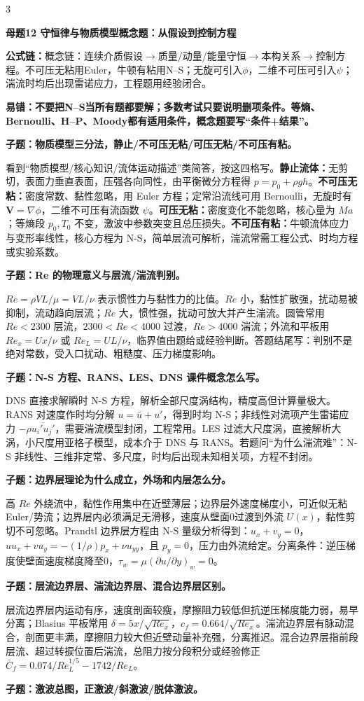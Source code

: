 \documentclass[a4paper]{article}
\newcommand{\mt}[1]{\vspace{0.12pt}\colorbox{M}{\parbox{\dimexpr\linewidth-2\fboxsep}{\color{white}\bfseries #1}}\par}
\newcommand{\qt}[1]{\vspace{0.04pt}\colorbox{Q}{\parbox{\dimexpr\linewidth-2\fboxsep}{\color{white}\bfseries #1}}\par}
\newcommand{\ans}[1]{\colorbox{G}{\parbox{\dimexpr\linewidth-2\fboxsep}{#1}}\par}
\newcommand{\warn}[1]{\colorbox{Y}{\parbox{\dimexpr\linewidth-2\fboxsep}{\color{E}\bfseries #1}}\par}
\newcommand{\form}[1]{{\color{M}\bfseries 公式链：}#1\par}
\begin{document}
\begin{multicols}{3}
\mt{母题12 守恒律与物质模型概念题：从假设到控制方程}
\form{概念链：连续介质假设$\to$质量/动量/能量守恒$\to$本构关系$\to$控制方程。不可压无粘用Euler，牛顿有粘用N--S；无旋可引入$\phi$，二维不可压可引入$\psi$；湍流时均后出现雷诺应力，工程题用经验闭合。}
\warn{易错：不要把N--S当所有题都要解；多数考试只要说明删项条件。等熵、Bernoulli、H--P、Moody都有适用条件，概念题要写“条件+结果”。}
\qt{子题：物质模型三分法，静止/不可压无粘/可压无粘/不可压有粘。}
\ans{看到“物质模型/核心知识/流体运动描述”类简答，按这四格写。\textbf{静止流体：}无剪切，表面力垂直表面，压强各向同性，由平衡微分方程得 $p=p_0+\rho gh$。\textbf{不可压无粘：}密度常数、黏性忽略，用 Euler 方程；定常沿流线可用 Bernoulli，无旋时有 $\bm V=\nabla\phi$，二维不可压有流函数 $\psi$。\textbf{可压无粘：}密度变化不能忽略，核心量为 $Ma$；等熵段 $p_0,T_0$ 不变，激波中参数突变且总压损失。\textbf{不可压有粘：}牛顿流体应力与变形率线性，核心方程为 N-S，简单层流可解析，湍流常需工程公式、时均方程或实验系数。}
\qt{子题：Re 的物理意义与层流/湍流判别。}
\ans{$Re=\rho VL/\mu=VL/\nu$ 表示惯性力与黏性力的比值。$Re$ 小，黏性扩散强，扰动易被抑制，流动趋向层流；$Re$ 大，惯性强，扰动可放大并产生湍流。圆管常用 $Re<2300$ 层流，$2300<Re<4000$ 过渡，$Re>4000$ 湍流；外流和平板用 $Re_x=Ux/\nu$ 或 $Re_L=UL/\nu$，临界值由题给或经验判断。答题结尾写：判别不是绝对常数，受入口扰动、粗糙度、压力梯度影响。}
\qt{子题：N-S 方程、RANS、LES、DNS 课件概念怎么写。}
\ans{DNS 直接求解瞬时 N-S 方程，解析全部尺度涡结构，精度高但计算量极大。RANS 对速度作时均分解 $u=\bar u+u'$，得到时均 N-S；非线性对流项产生雷诺应力 $-\rho\overline{u_i'u_j'}$，需要湍流模型封闭，工程常用。LES 过滤大尺度涡，直接解析大涡，小尺度用亚格子模型，成本介于 DNS 与 RANS。若题问“为什么湍流难”：N-S 非线性、三维非定常、多尺度，时均后出现未知相关项，方程不封闭。}
\qt{子题：边界层理论为什么成立，外场和内层怎么分。}
\ans{高 $Re$ 外绕流中，黏性作用集中在近壁薄层；边界层外速度梯度小，可近似无粘 Euler/势流；边界层内必须满足无滑移，速度从壁面0过渡到外流 $U(x)$，黏性剪切不可忽略。Prandtl 边界层方程由 N-S 量级分析得到：$u_x+v_y=0$，$uu_x+vu_y=-(1/\rho)p_x+\nu u_{yy}$，且 $p_y=0$，压力由外流给定。分离条件：逆压梯度使壁面速度梯度降至0，$\tau_w=\mu(\partial u/\partial y)_w=0$。}
\qt{子题：层流边界层、湍流边界层、混合边界层区别。}
\ans{层流边界层内运动有序，速度剖面较瘦，摩擦阻力较低但抗逆压梯度能力弱，易早分离；Blasius 平板常用 $\delta=5x/\sqrt{Re_x}$，$c_f=0.664/\sqrt{Re_x}$。湍流边界层有脉动混合，剖面更丰满，摩擦阻力较大但近壁动量补充强，分离推迟。混合边界层指前段层流、超过转捩位置后湍流，总阻力按分段积分或经验修正 $\bar C_f=0.074/Re_L^{1/5}-1742/Re_L$。}
\qt{子题：激波总图，正激波/斜激波/脱体激波。}

\end{multicols}
\end{document}
